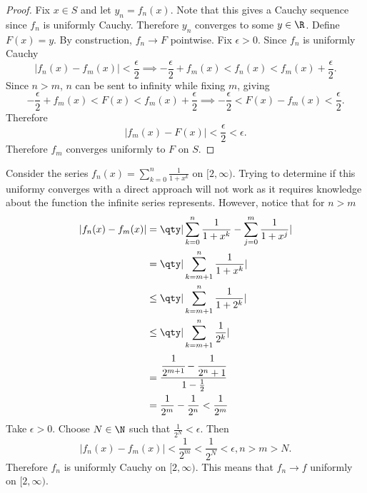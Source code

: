 \documentclass[../notes.tex]{subfiles}
\begin{document}
\begin{proof}
    Fix $x \in S$ and let $y_n = f_n(x)$. Note that this gives a Cauchy sequence since $f_n$ is uniformly Cauchy. Therefore $y_n$ converges to some $y \in \R$. Define $F(x) = y$. By construction, $f_n \to F$ pointwise. Fix $\epsilon > 0$. Since $f_n$ is uniformly Cauchy
    \[
        |f_n(x) - f_m(x)| < \frac{\epsilon}{2} \implies -\frac{\epsilon}{2} + f_m(x) < f_n(x) < f_m(x) + \frac{\epsilon}{2}
    .\]
    Since $n > m$, $n$ can be sent to infinity while fixing $m$, giving
    \[
        -\frac{\epsilon}{2} + f_m(x) < F(x) < f_m(x) + \frac{\epsilon}{2} \implies -\frac{\epsilon}{2} < F(x) - f_m(x) < \frac{\epsilon}{2}
    .\]
    Therefore
    \[
        |f_m(x) - F(x)| < \frac{\epsilon}{2} < \epsilon
    .\]
    Therefore $f_m$ converges uniformly to $F$ on $S$.
\end{proof}

\begin{example}
    Consider the series $f_n(x) = \displaystyle\sum_{k=0}^n \frac{1}{1 + x^k}$ on $[2, \infty)$. Trying to determine if this uniformy converges with a direct approach will not work as it requires knowledge about the function the infinite series represents. However, notice that for $n > m$
    \begin{align*}
        |f_n(x) - f_m(x)| &= \qty|\sum_{k=0}^n \frac{1}{1+x^k} - \sum_{j=0}^m \frac{1}{1+x^j}| \\
        &= \qty|\sum_{k=m+1}^n \frac{1}{1+x^k}| \\
        &\leq \qty|\sum_{k=m+1}^n \frac{1}{1+2^k}| \\
        &\leq \qty|\sum_{k=m+1}^n \frac{1}{2^k}|  \\
        &= \cfrac{\cfrac{1}{2^{m+1}} - \cfrac{1}{2^n+1}}{1 - \frac{1}{2}} \\
        &= \frac{1}{2^m} - \frac{1}{2^n} < \frac{1}{2^m}
    \end{align*}
    Take $\epsilon > 0$. Choose $N \in \N$ such that $\frac{1}{2^N} < \epsilon$. Then
    \[
        |f_n(x) - f_m(x)| < \frac{1}{2^m} < \frac{1}{2^N} < \epsilon, n > m > N
    .\]
    Therefore $f_n$ is uniformly Cauchy on $[2, \infty)$. This means that $f_n \to f$ uniformly on $[2, \infty)$.
\end{example}
\end{document}
